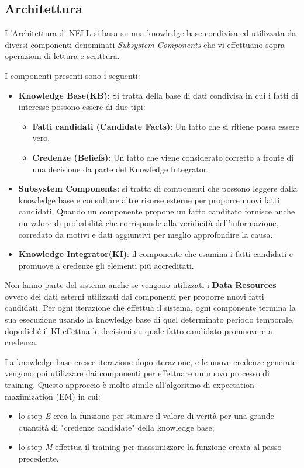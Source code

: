 \subsection{Architettura}
L'Architettura di NELL si basa su una knowledge base condivisa ed utilizzata da diversi componenti denominati \textit{Subsystem Components} che vi effettuano sopra operazioni di lettura e scrittura. 

I componenti presenti sono i seguenti:
\begin{itemize}
    \item \textbf{Knowledge Base(KB)}: Si tratta della base di dati condivisa in cui i fatti di interesse possono essere di due tipi:
    \begin{itemize}
        \item \textbf{Fatti candidati (Candidate Facts)}: Un fatto che si ritiene possa essere vero.
        \item \textbf{Credenze (Beliefs)}: Un fatto che viene considerato corretto a fronte di una decisione da parte del Knowledge Integrator.
    \end{itemize}
    \item \textbf{Subsystem Components}: si tratta di componenti che possono leggere dalla knowledge base e consultare altre risorse esterne per proporre nuovi fatti candidati.
    Quando un componente propone un fatto canditato fornisce anche un valore di probabilità che corrisponde alla veridicità dell'informazione, corredato da motivi e dati aggiuntivi per meglio approfondire la causa.
    \item \textbf{Knowledge Integrator(KI)}: il componente che esamina i fatti candidati e promuove a credenze gli elementi più accreditati.
\end{itemize}

\noindent Non fanno parte del sistema anche se vengono utilizzati i \textbf{Data Resources} ovvero dei dati esterni utilizzati dai componenti per proporre nuovi fatti candidati. Per ogni iterazione che effettua il sistema, ogni componente termina la sua esecuzione usando la knowledge base di quel determinato periodo temporale, dopodiché il KI effettua le decisioni su quale fatto candidato promuovere a credenza.


\noindent La knowledge base cresce iterazione dopo iterazione, e le nuove credenze generate vengono poi utilizzare dai componenti per effettuare un nuovo processo di training. Questo approccio è molto simile all'algoritmo di expectation–maximization (EM) in cui:
\begin{itemize}
    \item lo step \textit{E} crea la funzione per stimare il valore di verità per una grande quantità di "credenze candidate" della knowledge base;
    \item lo step \textit{M} effettua il training per massimizzare la funzione creata al passo precedente\cite{TowardAnArchitecture:online}.
\end{itemize}

